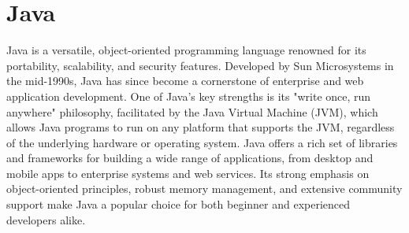 \chapter{Java}
\thispagestyle{fancy}
\lstset{language=java, style=javastyle}

Java is a versatile, object-oriented programming language renowned for its portability, scalability, and security features. Developed by Sun Microsystems in the mid-1990s, Java has since become a cornerstone of enterprise and web application development. One of Java's key strengths is its "write once, run anywhere" philosophy, facilitated by the Java Virtual Machine (JVM), which allows Java programs to run on any platform that supports the JVM, regardless of the underlying hardware or operating system. Java offers a rich set of libraries and frameworks for building a wide range of applications, from desktop and mobile apps to enterprise systems and web services. Its strong emphasis on object-oriented principles, robust memory management, and extensive community support make Java a popular choice for both beginner and experienced developers alike.